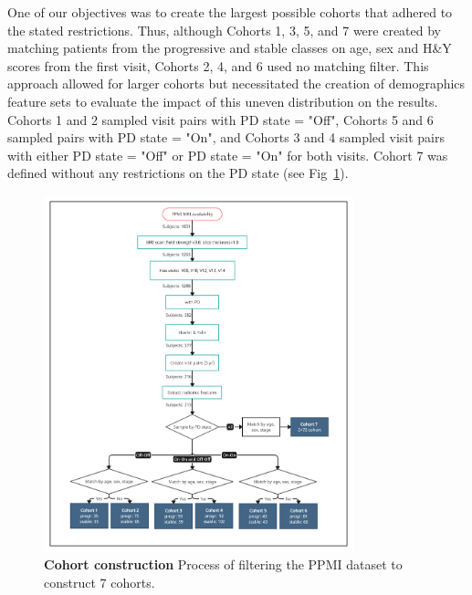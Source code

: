 One of our objectives was to create the largest possible cohorts that adhered to the stated restrictions. Thus, although Cohorts 1, 3, 5, and 7 were created 
by matching patients from the progressive and stable classes on age, sex and H\&Y scores from the first visit, Cohorts 2, 4, and 6 used no matching filter.
This approach allowed for larger cohorts but necessitated the creation of demographics feature sets to evaluate the impact of this uneven distribution on the results. 
Cohorts 1 and 2 sampled visit pairs with PD state = "Off", Cohorts 5 and 6 sampled pairs with PD state = "On", and Cohorts 3 and 4 sampled visit pairs with 
either PD state = "Off" or PD state = "On" for both visits. Cohort 7 was defined without any restrictions on the PD state (see Fig~\ref{cohortCreationFlowchart}).

\begin{figure}[htbp]
  \centering
  \includegraphics[width=0.8\textwidth]{images/Cohort7_flowchart.png}
  \caption{{\bf Cohort construction} Process of filtering the PPMI dataset to construct 7 cohorts.}
  \label{cohortCreationFlowchart}
\end{figure}